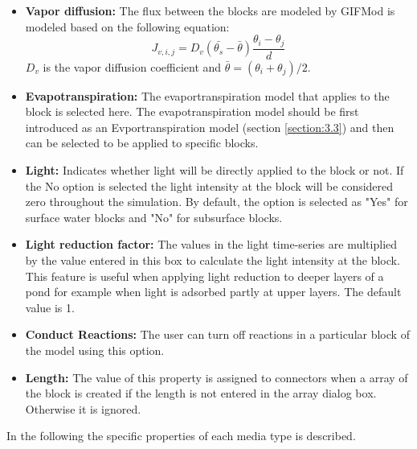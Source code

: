 \begin{itemize}
\item \textbf{Vapor diffusion: } The flux between the blocks are modeled by GIFMod is modeled based on the following equation:
\begin{equation}
\label{eq:7}
J_{v,i,j}=D_v(\bar{\theta_s}-\bar{\theta})\frac{\theta_i-\theta_j}{d}
\end{equation}
$D_v$ is the vapor diffusion coefficient and $\bar{\theta}=(\theta_i+\theta_j)/2$. 
\item \textbf{Evapotranspiration: } The evaportranspiration model that applies to the block is selected here. The evapotranspiration model should be first introduced as an Evportranspiration model (section \ref{section:3.3}) and then can be selected to be applied to specific blocks. 
\item \textbf{Light: } Indicates whether light will be directly applied to the block or not. If the No option is selected the light intensity at the block will be considered zero throughout the simulation. By default, the option is selected as "Yes" for surface water blocks and "No" for subsurface blocks. 
\item \textbf{Light reduction factor: } The values in the light time-series are multiplied by the value entered in this box to calculate the light intensity at the block. This feature is useful when applying light reduction to deeper layers of a pond for example when light is adsorbed partly at upper layers. The default value is 1. 
\item \textbf{Conduct Reactions: } The user can turn off reactions in a particular block of the model using this option. 
\item \textbf{Length: } The value of this property is assigned to connectors when a array of the block is created if the length is not entered in the array dialog box. Otherwise it is ignored. 
\end{itemize}
In the following the specific properties of each media type is described. 

